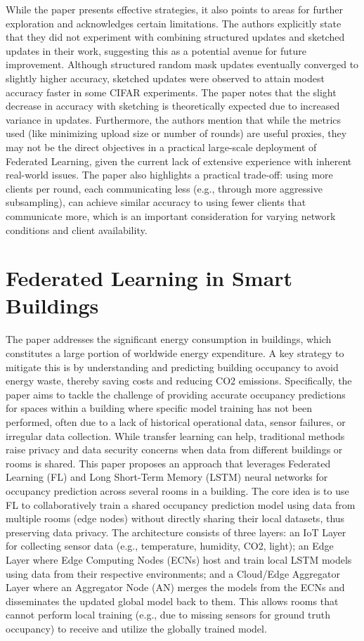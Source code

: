 While the paper presents effective strategies, it also points to areas for further exploration and acknowledges certain limitations. The authors explicitly state that they did not experiment with combining structured updates and sketched updates in their work, suggesting this as a potential avenue for future improvement. Although structured random mask updates eventually converged to slightly higher accuracy, sketched updates were observed to attain modest accuracy faster in some CIFAR experiments. The paper notes that the slight decrease in accuracy with sketching is theoretically expected due to increased variance in updates. Furthermore, the authors mention that while the metrics used (like minimizing upload size or number of rounds) are useful proxies, they may not be the direct objectives in a practical large-scale deployment of Federated Learning, given the current lack of extensive experience with inherent real-world issues. The paper also highlights a practical trade-off: using more clients per round, each communicating less (e.g., through more aggressive subsampling), can achieve similar accuracy to using fewer clients that communicate more, which is an important consideration for varying network conditions and client availability. 


\section{Federated Learning in Smart Buildings}

The paper \cite{khan2022occupancy} addresses the significant energy consumption in buildings, which constitutes a large portion of worldwide energy expenditure. A key strategy to mitigate this is by understanding and predicting building occupancy to avoid energy waste, thereby saving costs and reducing CO2 emissions. Specifically, the paper aims to tackle the challenge of providing accurate occupancy predictions for spaces within a building where specific model training has not been performed, often due to a lack of historical operational data, sensor failures, or irregular data collection. While transfer learning can help, traditional methods raise privacy and data security concerns when data from different buildings or rooms is shared. This paper proposes an approach that leverages Federated Learning (FL) and Long Short-Term Memory (LSTM) neural networks for occupancy prediction across several rooms in a building. The core idea is to use FL to collaboratively train a shared occupancy prediction model using data from multiple rooms (edge nodes) without directly sharing their local datasets, thus preserving data privacy. The architecture consists of three layers: an IoT Layer for collecting sensor data (e.g., temperature, humidity, CO2, light); an Edge Layer where Edge Computing Nodes (ECNs) host and train local LSTM models using data from their respective environments; and a Cloud/Edge Aggregator Layer where an Aggregator Node (AN) merges the models from the ECNs and disseminates the updated global model back to them. This allows rooms that cannot perform local training (e.g., due to missing sensors for ground truth occupancy) to receive and utilize the globally trained model.

